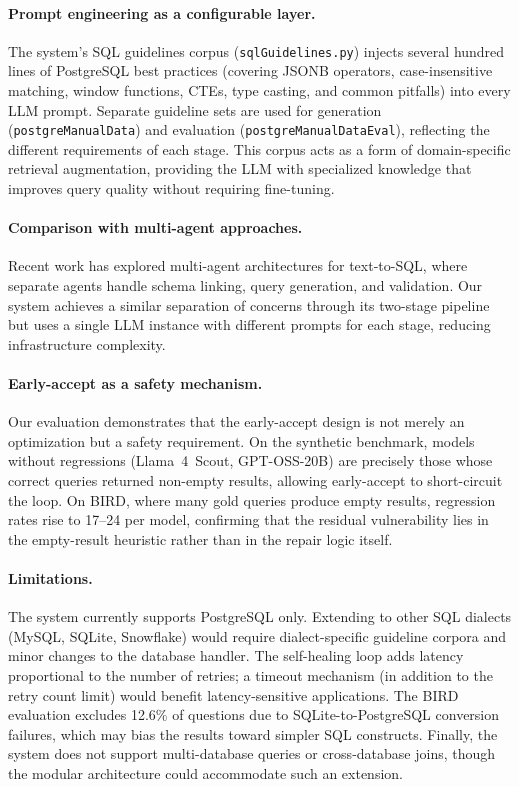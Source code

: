 \documentclass{article}
\begin{document}
\paragraph{Prompt engineering as a configurable layer.} The system's SQL guidelines corpus (\texttt{sqlGuidelines.py}) injects several hundred lines of PostgreSQL best practices (covering JSONB operators, case-insensitive matching, window functions, CTEs, type casting, and common pitfalls) into every LLM prompt. Separate guideline sets are used for generation (\texttt{postgreManualData}) and evaluation (\texttt{postgreManualDataEval}), reflecting the different requirements of each stage. This corpus acts as a form of domain-specific retrieval augmentation, providing the LLM with specialized knowledge that improves query quality without requiring fine-tuning.

\paragraph{Comparison with multi-agent approaches.} Recent work has explored multi-agent architectures for text-to-SQL, where separate agents handle schema linking, query generation, and validation. Our system achieves a similar separation of concerns through its two-stage pipeline but uses a single LLM instance with different prompts for each stage, reducing infrastructure complexity.

\paragraph{Early-accept as a safety mechanism.} Our evaluation demonstrates that the early-accept design is not merely an optimization but a safety requirement. On the synthetic benchmark, models without regressions (Llama~4~Scout, GPT-OSS-20B) are precisely those whose correct queries returned non-empty results, allowing early-accept to short-circuit the loop. On BIRD, where many gold queries produce empty results, regression rates rise to 17--24 per model, confirming that the residual vulnerability lies in the empty-result heuristic rather than in the repair logic itself.

\paragraph{Limitations.} The system currently supports PostgreSQL only. Extending to other SQL dialects (MySQL, SQLite, Snowflake) would require dialect-specific guideline corpora and minor changes to the database handler. The self-healing loop adds latency proportional to the number of retries; a timeout mechanism (in addition to the retry count limit) would benefit latency-sensitive applications. The BIRD evaluation excludes 12.6\% of questions due to SQLite-to-PostgreSQL conversion failures, which may bias the results toward simpler SQL constructs. Finally, the system does not support multi-database queries or cross-database joins, though the modular architecture could accommodate such an extension.
\end{document}
